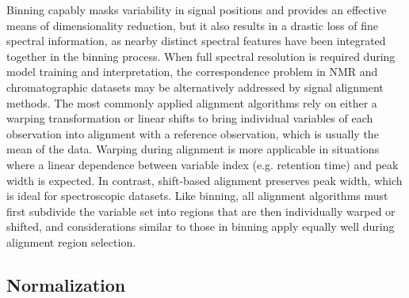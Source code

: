 \begin{doublespace}
Binning capably masks variability in signal positions and provides an effective
means of dimensionality reduction, but it also results in a drastic loss of
fine spectral information, as nearby distinct spectral features have been
integrated together in the binning process. When full spectral resolution is
required during model training and interpretation, the correspondence problem
in NMR and chromatographic datasets may be alternatively addressed by signal
alignment methods. The most commonly applied alignment algorithms rely on
either a warping transformation
\cite{nielsen:jchrom1998,
      forshed:aca2003,
      wu:jcim2006} or linear shifts
\cite{veselkov:anchem2009,
      savorani:jmr2010,
      tomasi:jchrom2011} to bring individual variables of each observation
into alignment with a reference observation, which is usually the mean of
the data. Warping during alignment is more applicable in situations where
a linear dependence between variable index (e.g. retention time) and peak
width is expected. In contrast, shift-based alignment preserves peak width,
which is ideal for spectroscopic datasets. Like binning, all alignment
algorithms must first subdivide the variable set into regions that are then
individually warped or shifted, and considerations similar to those in
binning apply equally well during alignment region selection.
\end{doublespace}

\subsection{Normalization}

